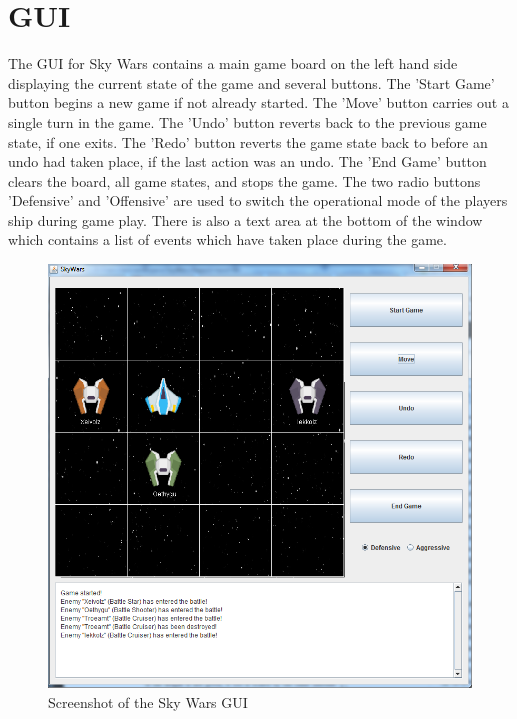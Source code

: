 \documentclass{article}
\begin{document}
	\newpage  	
  	
  	\section{GUI}
  	The GUI for Sky Wars contains a main game board on the left hand side displaying the current state of the game and several buttons. The 'Start Game' button begins a new game if not already started. The 'Move' button carries out a single turn in the game. The 'Undo' button reverts back to the previous game state, if one exits. The 'Redo' button reverts the game state back to before an undo had taken place, if the last action was an undo. The 'End Game' button clears the board, all game states, and stops the game. The two radio buttons 'Defensive' and 'Offensive' are used to switch the operational mode of the players ship during game play. There is also a text area at the bottom of the window which contains a list of events which have taken place during the game.
  		\begin{figure}[h]
  			\begin{center}
  				\includegraphics[width=.9\textwidth]{guiscreenshot}
  				\caption{Screenshot of the Sky Wars GUI}
  			\end{center}
  		\end{figure}
\end{document}
